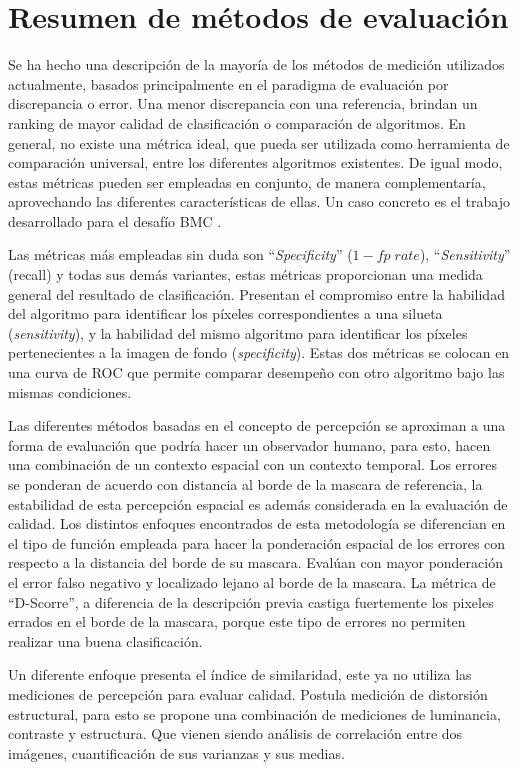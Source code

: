 \section{Resumen de métodos de evaluación}
Se ha hecho una descripción de la mayoría de los métodos de medición utilizados actualmente, basados principalmente en el paradigma de evaluación por discrepancia  o error. Una menor discrepancia con una referencia, brindan un ranking de mayor calidad de clasificación o comparación de algoritmos. En general, no existe una métrica ideal, que pueda ser utilizada como herramienta de comparación universal, entre los diferentes algoritmos existentes. De igual modo, estas métricas pueden ser empleadas en conjunto, de manera complementaría, aprovechando las diferentes características de ellas. Un caso concreto es el trabajo desarrollado para el desafío BMC \cite{park_benchmark_2013}.

Las métricas más empleadas sin duda son ``\textit{Specificity}'' ($1-fp\; rate$), ``\textit{Sensitivity}'' (recall) y todas sus demás variantes, estas métricas proporcionan una medida general del resultado de clasificación. Presentan el compromiso entre la habilidad del algoritmo para identificar los píxeles correspondientes a una silueta (\emph{sensitivity}), y la habilidad del mismo algoritmo para identificar los píxeles pertenecientes a la imagen de fondo (\emph{specificity}). Estas dos métricas se colocan en una curva de ROC que permite comparar desempeño con otro algoritmo bajo las mismas condiciones. 

Las diferentes métodos basadas en el concepto de percepción se aproximan a una forma de evaluación que podría hacer un observador humano, para esto, hacen una combinación de un contexto espacial con un contexto temporal. Los errores se ponderan de acuerdo con distancia al borde de la mascara de referencia, la estabilidad de esta percepción espacial es además considerada en la evaluación de calidad. Los distintos enfoques encontrados de esta metodología se diferencian en el tipo de función empleada para hacer la ponderación espacial de los errores con respecto a la distancia del borde de su mascara. Evalúan con mayor ponderación el error falso negativo y localizado lejano al borde de la mascara. La métrica de ``D-Scorre'', a diferencia de la descripción previa castiga fuertemente los pixeles errados en el borde de la mascara, porque este tipo de errores no permiten realizar una buena clasificación.

Un diferente enfoque presenta el índice de similaridad, este ya no utiliza las mediciones de percepción para evaluar calidad. Postula medición de distorsión estructural, para esto se propone una combinación de mediciones de luminancia, contraste y estructura. Que vienen siendo análisis de correlación entre dos imágenes, cuantificación de sus varianzas y sus medias. 

